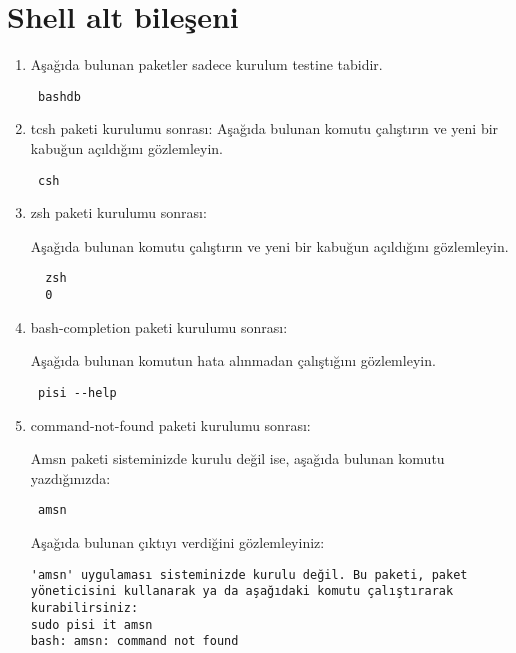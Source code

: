 \documentclass[a4paper,10pt]{article}
\begin{document}
\section{Shell alt bileşeni}
\begin{enumerate}
\item Aşağıda bulunan paketler sadece kurulum testine tabidir.
\begin{verbatim}
 bashdb
\end{verbatim}
\item tcsh paketi kurulumu sonrası:
Aşağıda bulunan komutu çalıştırın ve yeni bir kabuğun açıldığını gözlemleyin.

\begin{verbatim}
 csh
\end{verbatim}

 \item zsh paketi kurulumu sonrası:

Aşağıda bulunan komutu çalıştırın ve yeni bir kabuğun açıldığını gözlemleyin.
 \begin{verbatim}
  zsh
  0
 \end{verbatim}

 \item bash-completion paketi kurulumu sonrası:

Aşağıda bulunan komutun hata alınmadan çalıştığını gözlemleyin.
\begin{verbatim}
 pisi --help
\end{verbatim}

\item command-not-found paketi kurulumu sonrası:

Amsn paketi sisteminizde kurulu değil ise, aşağıda bulunan komutu yazdığınızda:
\begin{verbatim}
 amsn
\end{verbatim}

Aşağıda bulunan çıktıyı verdiğini gözlemleyiniz:
\begin{verbatim}
'amsn' uygulaması sisteminizde kurulu değil. Bu paketi, paket yöneticisini kullanarak ya da aşağıdaki komutu çalıştırarak kurabilirsiniz:
sudo pisi it amsn
bash: amsn: command not found
\end{verbatim}

\end{enumerate}
\end{document}
